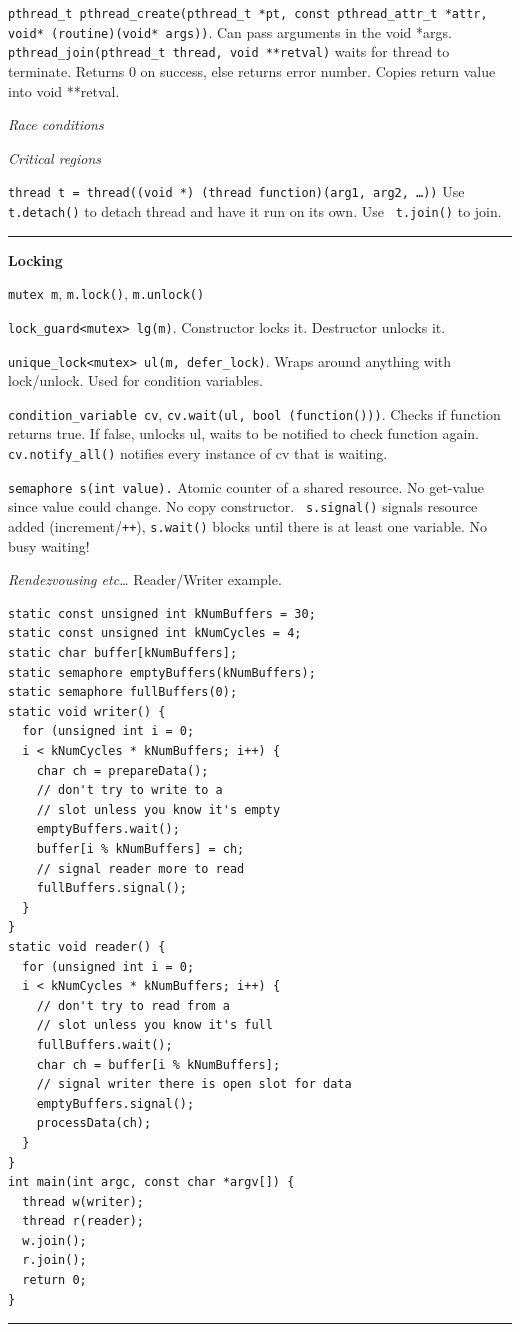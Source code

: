 \documentclass{article}
\begin{document}
\begin{multicols}{2}
  {\tt pthread\_t pthread\_create(pthread\_t *pt, const pthread\_attr\_t *attr,
  void* (routine)(void* args))}. Can pass arguments in the void *args.\\
  {\tt pthread\_join(pthread\_t thread, void **retval)} waits for thread to
  terminate. Returns 0 on success, else returns error number. Copies return
  value into void **retval.

  {\it Race conditions}

  {\it Critical regions}

  {\tt thread t = thread((void *) (thread function)(arg1, arg2, \ldots))} Use
  {\tt t.detach()} to detach thread and have it run on its own. Use {\tt
  t.join()} to join.

  \noindent\rule{4cm}{0.4pt}

  {\bf Locking}

  {\tt mutex m}, {\tt m.lock()}, {\tt m.unlock()}

  {\tt lock\_guard<mutex> lg(m)}. Constructor locks it. Destructor unlocks it.

  {\tt unique\_lock<mutex> ul(m, defer\_lock)}. Wraps around anything with
  lock/unlock. Used for condition variables.

  {\tt condition\_variable cv}, {\tt cv.wait(ul, bool (function()))}. Checks if
  function returns true. If false, unlocks ul, waits to be notified to check
  function again. {\tt cv.notify\_all()} notifies every instance of cv that is
  waiting.

  {\tt semaphore s(int value).} Atomic counter of a shared resource. No
  get-value since value could change. No copy constructor. {\tt
  s.signal()} signals resource added (increment/\texttt{++}), {\tt s.wait()}
  blocks until there is at least one variable. No busy waiting!

  {\it Rendezvousing etc\ldots} Reader/Writer example.
  \begin{verbatim}
static const unsigned int kNumBuffers = 30;
static const unsigned int kNumCycles = 4;
static char buffer[kNumBuffers];
static semaphore emptyBuffers(kNumBuffers);
static semaphore fullBuffers(0);
static void writer() {
  for (unsigned int i = 0;
  i < kNumCycles * kNumBuffers; i++) {
    char ch = prepareData();
    // don't try to write to a
    // slot unless you know it's empty
    emptyBuffers.wait();
    buffer[i % kNumBuffers] = ch;
    // signal reader more to read
    fullBuffers.signal();
  }
}
static void reader() {
  for (unsigned int i = 0;
  i < kNumCycles * kNumBuffers; i++) {
    // don't try to read from a
    // slot unless you know it's full
    fullBuffers.wait();
    char ch = buffer[i % kNumBuffers];
    // signal writer there is open slot for data
    emptyBuffers.signal();
    processData(ch);
  }
}
int main(int argc, const char *argv[]) {
  thread w(writer);
  thread r(reader);
  w.join();
  r.join();
  return 0;
} \end{verbatim}
\noindent\rule{4cm}{0.4pt}


\end{multicols}
\end{document}
